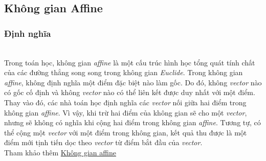 \documentclass{article}
\begin{document}

\subsection{Không gian Affine}
\label{n2}
\subsubsection*{Định nghĩa}
\\

Trong toán học, không gian \textit{affine} là một cấu trúc hình học tổng quát tính chất của các đường thẳng song song trong không gian \textit{Euclide}. Trong không gian \textit{affine}, không định nghĩa một điểm đặc biệt nào làm gốc. Do đó, không \textit{vector} nào có gốc cố định và không \textit{vector} nào có thể liên kết được duy nhất với một điểm. Thay vào đó, các nhà toán học định nghĩa các \textit{vector} nối giữa hai điểm trong không gian \textit{affine}. Vì vậy, khi trừ hai điểm của không gian sẽ cho một \textit{vector}, nhưng sẽ không có nghĩa khi cộng hai điểm trong không gian \textit{affine}. Tương tự, có thể cộng một \textit{vector} với một điểm trong không gian, kết quả thu được là một điểm mới tịnh tiến dọc theo \textit{vector} từ điểm bắt đầu của \textit{vector}. \\Tham khảo thêm \href{https://vi.wikipedia.org/wiki/Kh%C3%B4ng_gian_afin}{Không gian affine}
\end{document}
